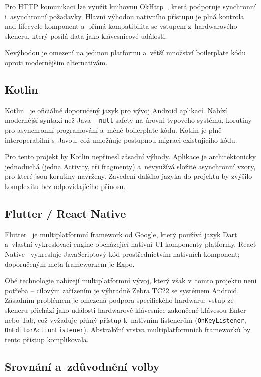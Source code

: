 Pro HTTP komunikaci lze využít knihovnu OkHttp~\cite{okhttp}, která podporuje synchronní i~asynchronní požadavky. Hlavní výhodou nativního přístupu je plná kontrola nad lifecycle komponent a~přímá kompatibilita se vstupem z~hardwarového skeneru, který posílá data jako klávesnicové události.

Nevýhodou je omezení na jedinou platformu a~větší množství boilerplate kódu oproti modernějším alternativám.

\subsection{Kotlin}

Kotlin~\cite{kotlin} je oficiálně doporučený jazyk pro vývoj Android aplikací. Nabízí modernější syntaxi než Java -- \texttt{null} safety na úrovni typového systému, korutiny pro asynchronní programování a~méně boilerplate kódu. Kotlin je plně interoperabilní s~Javou, což umožňuje postupnou migraci existujícího kódu.

Pro tento projekt by Kotlin nepřinesl zásadní výhody. Aplikace je architektonicky jednoduchá (jedna Activity, tři fragmenty) a~nevyužívá složité asynchronní vzory, pro které jsou korutiny navrženy. Zavedení dalšího jazyka do projektu by zvýšilo komplexitu bez odpovídajícího přínosu.

\subsection{Flutter / React Native}

Flutter~\cite{flutter} je multiplatformní framework od Google, který používá jazyk Dart a~vlastní vykreslovací engine obcházející nativní UI komponenty platformy. React Native~\cite{reactnative} vykresluje JavaScriptový kód prostřednictvím nativních komponent; doporučeným meta-frameworkem je Expo.

Obě technologie nabízejí multiplatformní vývoj, který však v~tomto projektu není potřeba -- cílovým zařízením je výhradně Zebra TC22 se systémem Android. Zásadním problémem je omezená podpora specifického hardwaru: vstup ze skeneru přichází jako události hardwarové klávesnice zakončené klávesou Enter nebo Tab, což vyžaduje přímý přístup k~nativním listenerům (\texttt{OnKeyListener}, \texttt{OnEditorActionListener}). Abstrakční vrstva multiplatformních frameworků by tento přístup komplikovala.

\subsection{Srovnání a~zdůvodnění volby}

